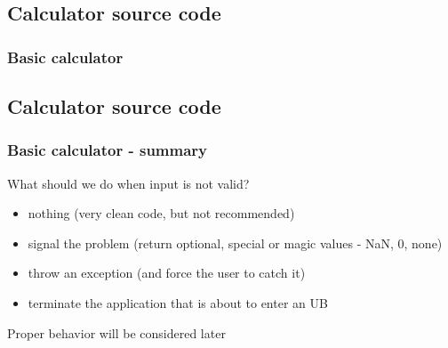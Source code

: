 \documentclass{beamer}
\begin{document}
\subsection{Calculator source code}
\begin{frame}[fragile]
\frametitle{Basic calculator}
\end{frame}

\subsection{Calculator source code}
\begin{frame}[fragile]
\frametitle{Basic calculator - summary}
What should we do when input is not valid?
\pause
\begin{itemize}[<+->]
  \item nothing (very clean code, but not recommended)
  \item signal the problem (return optional, special or magic values - NaN, 0, none)
  \item throw an exception (and force the user to catch it)
  \item terminate the application that is about to enter an UB
\end{itemize}
\pause
\begin{block}{}
Proper behavior will be considered later
\end{block}
\end{frame}
\end{document}

